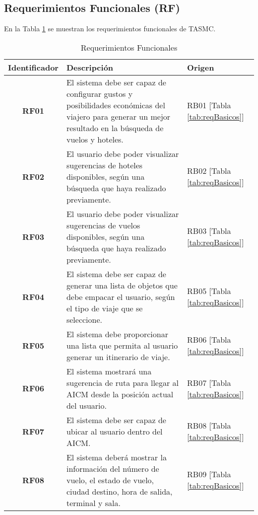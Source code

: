 \subsection{Requerimientos Funcionales (RF)}

En la Tabla \ref{tab:reqFuncionales} se muestran los requerimientos funcionales de TASMC.

\begin{table}[h]
	\begin{center}
		\begin{tabular}{|c|p{9.4cm}|p{1.5cm}|}
			\hline  \rowcolor[RGB]{51,153,255} 
				\textcolor{blanco}{\bf Identificador} &
				\textcolor{blanco}{\bf Descripción} &
				\textcolor{blanco}{\bf Origen} \\
			\hline 
				\textbf{RF01} &
				El sistema debe ser capaz de configurar gustos y posibilidades económicas del viajero para generar un mejor resultado en la búsqueda de vuelos y hoteles. &
				RB01 [Tabla \ref{tab:reqBasicos}] \\
      		\hline \rowcolor[RGB]{240,248,255}
      			\textbf{RF02} &
				El usuario debe poder visualizar sugerencias de hoteles disponibles,  según una búsqueda que haya realizado previamente. &
				RB02 [Tabla \ref{tab:reqBasicos}] \\
			\hline 
				\textbf{RF03} &
				El usuario debe poder visualizar sugerencias de vuelos disponibles, según una búsqueda que haya realizado previamente. &
				RB03 [Tabla \ref{tab:reqBasicos}] \\ 
			\hline \rowcolor[RGB]{240,248,255}
				\textbf{RF04} &
				El sistema debe ser capaz de generar una lista de objetos que debe empacar el usuario, según el tipo de viaje que se seleccione. &
				RB05 [Tabla \ref{tab:reqBasicos}] \\ 
			\hline 
				\textbf{RF05} &
				El sistema debe proporcionar una lista que permita al usuario generar un itinerario de viaje. &
				RB06 [Tabla \ref{tab:reqBasicos}] \\ 
			\hline \rowcolor[RGB]{240,248,255}
				\textbf{RF06} &
				El sistema mostrará una sugerencia de ruta para llegar al AICM desde la posición actual del usuario. &
				RB07 [Tabla \ref{tab:reqBasicos}] \\ 
			\hline 
				\textbf{RF07} &
				El sistema debe ser capaz de ubicar al usuario dentro del AICM. &
				RB08 [Tabla \ref{tab:reqBasicos}] \\ 
			\hline \rowcolor[RGB]{240,248,255}
				\textbf{RF08} &
				El sistema deberá mostrar la información del número de vuelo, el estado de vuelo, ciudad destino, hora de salida, terminal y sala. &
				RB09 [Tabla \ref{tab:reqBasicos}] \\ 
			\hline
		\end{tabular}
	\end{center}
	\caption[Requerimientos Funcionales]{Requerimientos Funcionales} 
	\label{tab:reqFuncionales}
\end{table}
\clearpage
